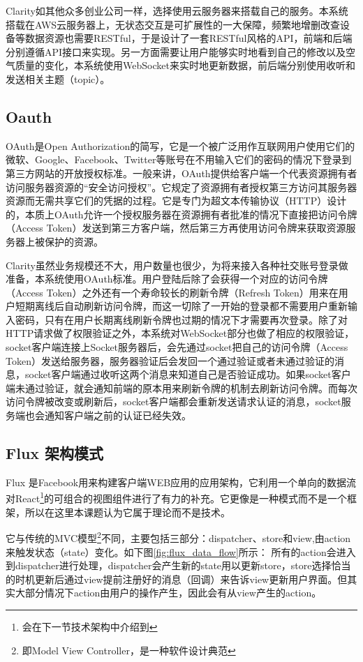 Clarity如其他众多创业公司一样，选择使用云服务器来搭载自己的服务。本系统搭载在AWS云服务器上，无状态交互是可扩展性的一大保障，频繁地增删改查设备等数据资源也需要RESTful，于是设计了一套RESTful风格的API，前端和后端分别遵循API接口来实现。另一方面需要让用户能够实时地看到自己的修改以及空气质量的变化，本系统使用WebSocket来实时地更新数据，前后端分别使用收听和发送相关主题（topic）。
\subsection{Oauth}
OAuth是Open Authorization的简写，它是一个被广泛用作互联网用户使用它们的微软、Google、Facebook、Twitter等账号在不用输入它们的密码的情况下登录到第三方网站的开放授权标准。一般来讲，OAuth提供给客户端一个代表资源拥有者访问服务器资源的“安全访问授权”。它规定了资源拥有者授权第三方访问其服务器资源而无需共享它们的凭据的过程。它是专门为超文本传输协议（HTTP）设计的，本质上OAuth允许一个授权服务器在资源拥有者批准的情况下直接把访问令牌（Access Token）发送到第三方客户端，然后第三方再使用访问令牌来获取资源服务器上被保护的资源。\supercite{hardt4rfc6749}

Clarity虽然业务规模还不大，用户数量也很少，为将来接入各种社交账号登录做准备，本系统使用OAuth标准。用户登陆后除了会获得一个对应的访问令牌（Access Token）之外还有一个寿命较长的刷新令牌（Refresh Token）用来在用户短期离线后自动刷新访问令牌，而这一切除了一开始的登录都不需要用户重新输入密码，只有在用户长期离线刷新令牌也过期的情况下才需要再次登录。除了对HTTP请求做了权限验证之外，本系统对WebSocket部分也做了相应的权限验证，socket客户端连接上Socket服务器后，会先通过socket把自己的访问令牌（Access Token）发送给服务器，服务器验证后会发回一个通过验证或者未通过验证的消息，socket客户端通过收听这两个消息来知道自己是否验证成功。如果socket客户端未通过验证，就会通知前端的原本用来刷新令牌的机制去刷新访问令牌。而每次访问令牌被改变或刷新后，socket客户端都会重新发送请求认证的消息，socket服务端也会通知客户端之前的认证已经失效。

\subsection{Flux 架构模式}
Flux 是Facebook用来构建客户端WEB应用的应用架构，它利用一个单向的数据流对React\footnote{会在下一节技术架构中介绍到}的可组合的视图组件进行了有力的补充。它更像是一种模式而不是一个框架，所以在这里本课题认为它属于理论而不是技术。

它与传统的MVC模型\footnote{即Model View Controller，是一种软件设计典范}不同，主要包括三部分：dispatcher、store和view,由action来触发状态（state）变化。如下图\ref{fig:flux_data_flow}所示： 所有的action会进入到dispatcher进行处理，dispatcher会产生新的state用以更新store，store选择恰当的时机更新后通过view提前注册好的消息（回调）来告诉view更新用户界面。但其实大部分情况下action由用户的操作产生，因此会有从view产生的action。


